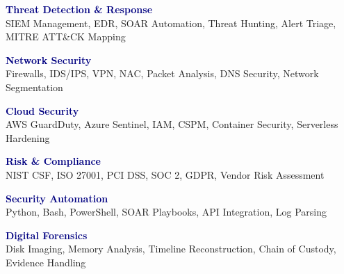 \documentclass[11pt,a4paper]{article}
\begin{document}
\noindent
\begin{minipage}{0.325\textwidth}
\begin{tcolorbox}[skillbox]
\textbf{\textcolor{navy}{Threat Detection \& Response}}\\[2pt]
{\small SIEM Management, EDR, SOAR Automation, Threat Hunting, Alert Triage, MITRE ATT\&CK Mapping}
\end{tcolorbox}
\end{minipage}\hfill
\begin{minipage}{0.325\textwidth}
\begin{tcolorbox}[skillbox]
\textbf{\textcolor{navy}{Network Security}}\\[2pt]
{\small Firewalls, IDS/IPS, VPN, NAC, Packet Analysis, DNS Security, Network Segmentation}
\end{tcolorbox}
\end{minipage}\hfill
\begin{minipage}{0.325\textwidth}
\begin{tcolorbox}[skillbox]
\textbf{\textcolor{navy}{Cloud Security}}\\[2pt]
{\small AWS GuardDuty, Azure Sentinel, IAM, CSPM, Container Security, Serverless Hardening}
\end{tcolorbox}
\end{minipage}\par

\vspace{6pt}

\noindent
\begin{minipage}{0.325\textwidth}
\begin{tcolorbox}[skillbox]
\textbf{\textcolor{navy}{Risk \& Compliance}}\\[2pt]
{\small NIST CSF, ISO 27001, PCI DSS, SOC 2, GDPR, Vendor Risk Assessment}
\end{tcolorbox}
\end{minipage}\hfill
\begin{minipage}{0.325\textwidth}
\begin{tcolorbox}[skillbox]
\textbf{\textcolor{navy}{Security Automation}}\\[2pt]
{\small Python, Bash, PowerShell, SOAR Playbooks, API Integration, Log Parsing}
\end{tcolorbox}
\end{minipage}\hfill
\begin{minipage}{0.325\textwidth}
\begin{tcolorbox}[skillbox]
\textbf{\textcolor{navy}{Digital Forensics}}\\[2pt]
{\small Disk Imaging, Memory Analysis, Timeline Reconstruction, Chain of Custody, Evidence Handling}
\end{tcolorbox}
\end{minipage}
\end{document}
